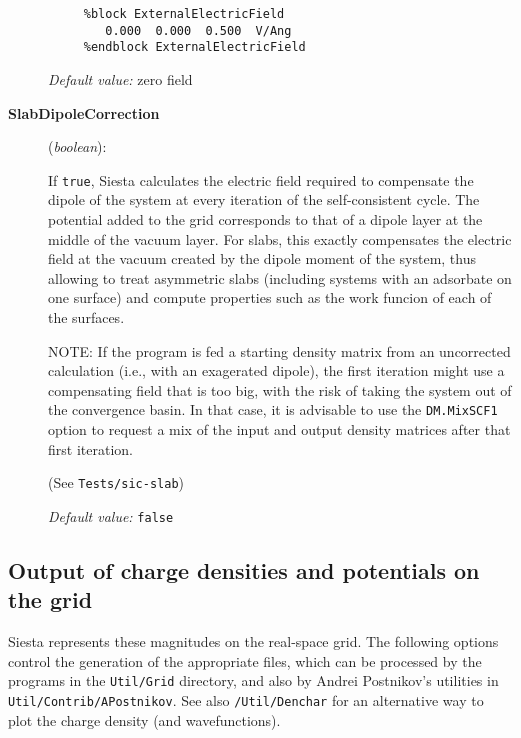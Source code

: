 \documentclass[11pt]{article}
\begin{document}
\begin{description}
\begin{verbatim}
     %block ExternalElectricField
        0.000  0.000  0.500  V/Ang
     %endblock ExternalElectricField
\end{verbatim}

{\it Default value:} zero field

\item[{\bf SlabDipoleCorrection}] ({\it boolean}):

If {\tt true}, {\sc Siesta} calculates the electric field required to
compensate the dipole of the system at every iteration of the
self-consistent cycle. The potential added to the grid corresponds to
that of a dipole layer at the middle of the vacuum layer. For slabs,
this exactly compensates the electric field at the vacuum created by
the dipole moment of the system, thus allowing to treat asymmetric
slabs (including systems with an adsorbate on one surface) and compute
properties such as the work funcion of each of the surfaces.

NOTE: If the program is fed a starting density matrix from an
uncorrected calculation (i.e., with an exagerated dipole), the first
iteration might use a compensating field that is too big, with the
risk of taking the system out of the convergence basin. In that case,
it is advisable to use the {\tt DM.MixSCF1} option to request a mix of the
input and output density matrices after that first iteration.

(See {\tt Tests/sic-slab})

{\it Default value:} {\tt false}

\end{description}


\vspace{5pt}
\subsection{Output of charge densities and potentials on the grid}

{\sc Siesta} represents these magnitudes on the real-space grid. The
following options control the generation of the appropriate files,
which can be processed by the programs in the {\tt Util/Grid}
directory, and also by Andrei Postnikov's utilities in {\tt
  Util/Contrib/APostnikov}. See also {\tt /Util/Denchar} for an
alternative way to plot the charge density (and wavefunctions).
\end{document}
